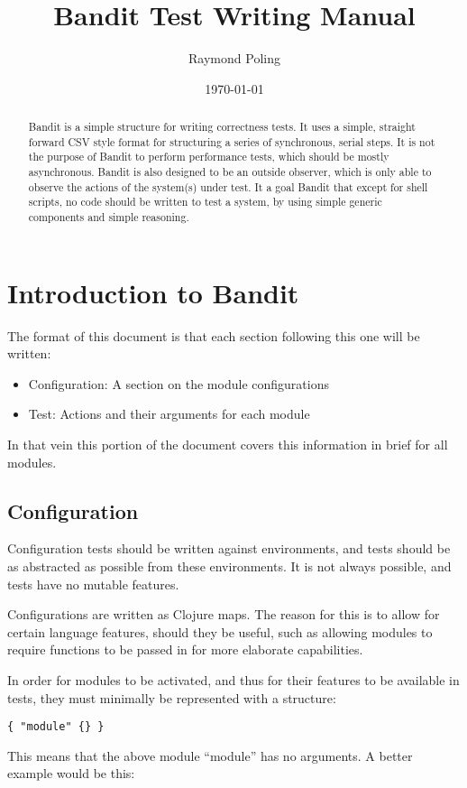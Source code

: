 \documentclass[12pt,a4paper,koma]{article}
\author{Raymond Poling}
\date{\today}
\title{Bandit Test Writing Manual}
\begin{document}
\maketitle
\tableofcontents

\begin{abstract}
Bandit is a simple structure for writing correctness tests. It uses a
simple, straight forward CSV style format for structuring a series of
synchronous, serial steps.  It is not the purpose of Bandit to perform
performance tests, which should be mostly asynchronous. Bandit is also
designed to be an outside observer, which is only able to observe the
actions of the system(s) under test. It a goal Bandit that except for
shell scripts, no code should be written to test a system, by using
simple generic components and simple reasoning.
\end{abstract}

\section{Introduction to Bandit}
\label{sec-1}

The format of this document is that each section following this one will
be written:
\begin{itemize}
\item Configuration: A section on the module configurations
\item Test: Actions and their arguments for each module
\end{itemize}
In that vein this portion of the document covers this information in
brief for all modules.

\subsection{Configuration}
\label{sec-1-1}

Configuration tests should be written against environments, and tests
should be as abstracted as possible from these environments. It is
not always possible, and tests have no mutable features.

Configurations are written as Clojure maps. The reason for this is to
allow for certain language features, should they be useful, such as
allowing modules to require functions to be passed in for more
elaborate capabilities.

In order for modules to be activated, and thus for their features to
be available in tests, they must minimally be represented with a
structure:
\begin{verbatim}
{ "module" {} }
\end{verbatim}
This means that the above module ``module'' has no arguments. A
better example would be this:
\end{document}
